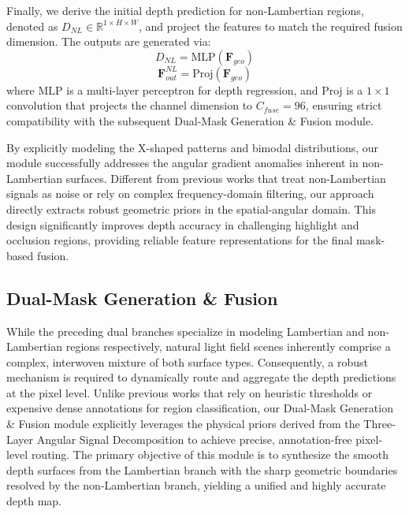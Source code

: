 \documentclass[lettersize,journal]{IEEEtran}
\begin{document}
Finally, we derive the initial depth prediction for non-Lambertian regions, denoted as $D_{NL} \in \mathbb{R}^{1 \times H \times W}$, and project the features to match the required fusion dimension. The outputs are generated via:
\begin{equation}
D_{NL} = \text{MLP}(\mathbf{F}_{geo})
\label{eq:ch3_15}
\end{equation}
\begin{equation}
\mathbf{F}_{out}^{NL} = \text{Proj}(\mathbf{F}_{geo})
\label{eq:ch3_16}
\end{equation}
where $\text{MLP}$ is a multi-layer perceptron for depth regression, and $\text{Proj}$ is a $1 \times 1$ convolution that projects the channel dimension to $C_{fuse}=96$, ensuring strict compatibility with the subsequent Dual-Mask Generation \& Fusion module.

By explicitly modeling the X-shaped patterns and bimodal distributions, our module successfully addresses the angular gradient anomalies inherent in non-Lambertian surfaces. Different from previous works that treat non-Lambertian signals as noise or rely on complex frequency-domain filtering, our approach directly extracts robust geometric priors in the spatial-angular domain. This design significantly improves depth accuracy in challenging highlight and occlusion regions, providing reliable feature representations for the final mask-based fusion.

\subsection{Dual-Mask Generation \& Fusion}

While the preceding dual branches specialize in modeling Lambertian and non-Lambertian regions respectively, natural light field scenes inherently comprise a complex, interwoven mixture of both surface types. Consequently, a robust mechanism is required to dynamically route and aggregate the depth predictions at the pixel level. Unlike previous works that rely on heuristic thresholds or expensive dense annotations for region classification, our Dual-Mask Generation \& Fusion module explicitly leverages the physical priors derived from the Three-Layer Angular Signal Decomposition to achieve precise, annotation-free pixel-level routing. The primary objective of this module is to synthesize the smooth depth surfaces from the Lambertian branch with the sharp geometric boundaries resolved by the non-Lambertian branch, yielding a unified and highly accurate depth map.
\end{document}
